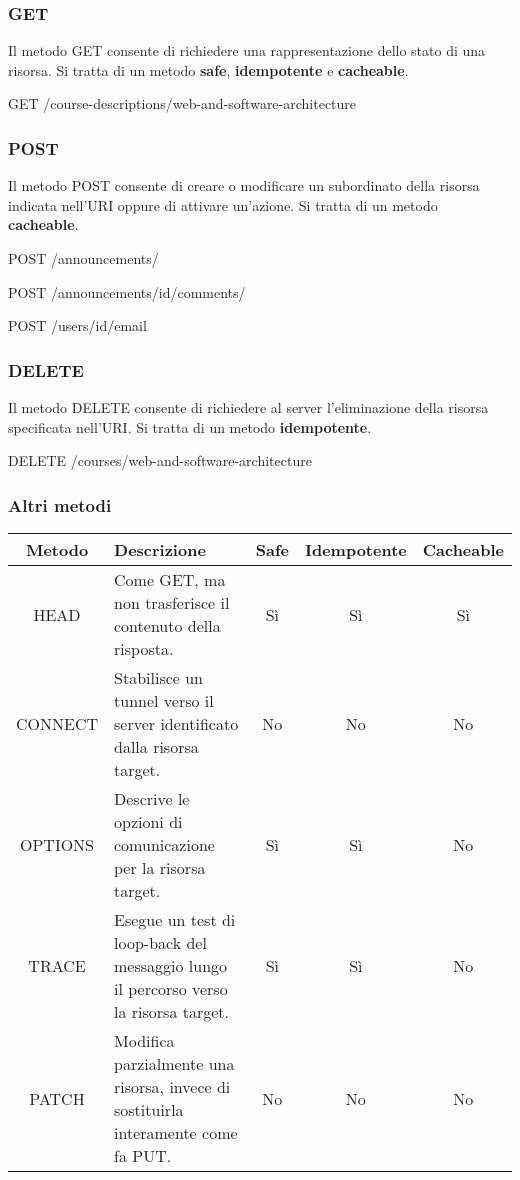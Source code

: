 \documentclass[12pt]{article}
\begin{document}
\subsubsection{GET}
Il metodo GET consente di richiedere una rappresentazione dello stato di una risorsa.
Si tratta di un metodo \textbf{safe}, \textbf{idempotente} e \textbf{cacheable}.
\begin{code}[language=HTTP]
  GET /course-descriptions/web-and-software-architecture
\end{code}

\subsubsection{POST}
Il metodo POST consente di creare o modificare un subordinato della risorsa indicata nell'URI oppure di attivare un'azione.
Si tratta di un metodo \textbf{cacheable}.
\begin{code}[language=HTTP]
  POST /announcements/
\end{code}
\begin{code}[language=HTTP]
  POST /announcements/{id}/comments/
\end{code}
\begin{code}[language=HTTP]
  POST /users/{id}/email
\end{code}

\subsubsection{DELETE}
Il metodo DELETE consente di richiedere al server l'eliminazione della risorsa specificata nell'URI.
Si tratta di un metodo \textbf{idempotente}.
\begin{code}[language=HTTP]
  DELETE /courses/web-and-software-architecture
\end{code}

\subsubsection{Altri metodi}
\begin{center}
\begin{tabularx}{\textwidth}{ |c|X|c|c|c| }
\hline
\textbf{Metodo} & \textbf{Descrizione} & \textbf{Safe} & \textbf{Idempotente} & \textbf{Cacheable}\\
\hline\hline
HEAD & Come GET, ma non trasferisce il contenuto della risposta. & Sì & Sì & Sì\\
\hline
CONNECT & Stabilisce un tunnel verso il server identificato dalla risorsa target. & No & No & No\\
\hline
OPTIONS & Descrive le opzioni di comunicazione per la risorsa target. & Sì & Sì & No\\
\hline
TRACE & Esegue un test di loop-back del messaggio lungo il percorso verso la risorsa target. & Sì & Sì & No\\
\hline
PATCH & Modifica parzialmente una risorsa, invece di sostituirla interamente come fa PUT. & No & No & No\\
\hline
\end{tabularx}
\end{center}
\end{document}
